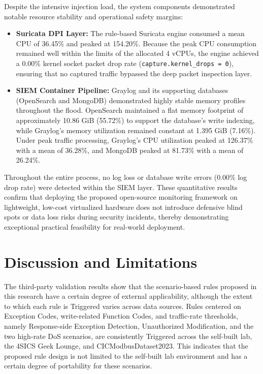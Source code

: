 \newpage
Despite the intensive injection load, the system components demonstrated notable resource stability and operational safety margins:
\begin{itemize}
    \item \textbf{Suricata DPI Layer:} The rule-based Suricata engine consumed a mean CPU of 36.45\% and peaked at 154.20\%. Because the peak CPU consumption remained well within the limits of the allocated 4 vCPUs, the engine achieved a 0.00\% kernel socket packet drop rate (\texttt{capture.kernel\_drops = 0}), ensuring that no captured traffic bypassed the deep packet inspection layer.
    \item \textbf{SIEM Container Pipeline:} Graylog and its supporting databases (OpenSearch and MongoDB) demonstrated highly stable memory profiles throughout the flood. OpenSearch maintained a flat memory footprint of approximately 10.86 GiB (55.72\%) to support the database's write indexing, while Graylog's memory utilization remained constant at 1.395 GiB (7.16\%). Under peak traffic processing, Graylog's CPU utilization peaked at 126.37\% with a mean of 36.28\%, and MongoDB peaked at 81.73\% with a mean of 26.24\%.
\end{itemize}

Throughout the entire process, no log loss or database write errors (0.00\% log drop rate) were detected within the SIEM layer. These quantitative results confirm that deploying the proposed open-source monitoring framework on lightweight, low-cost virtualized hardware does not introduce defensive blind spots or data loss risks during security incidents, thereby demonstrating exceptional practical feasibility for real-world deployment.
\newpage
\section{Discussion and Limitations}
The third-party validation results show that the scenario-based rules proposed in this research have a certain degree of external applicability, although the extent to which each rule is Triggered varies across data sources. Rules centered on Exception Codes, write-related Function Codes, and traffic-rate thresholds, namely Response-side Exception Detection, Unauthorized Modification, and the two high-rate DoS scenarios, are consistently Triggered across the self-built lab, the 4SICS Geek Lounge, and CICModbusDataset2023. This indicates that the proposed rule design is not limited to the self-built lab environment and has a certain degree of portability for these scenarios.

